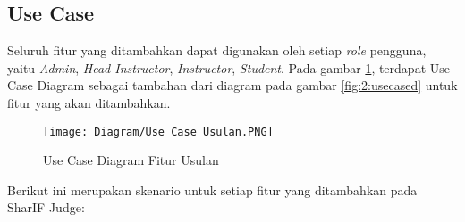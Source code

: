 \subsection{Use Case}

Seluruh fitur yang ditambahkan dapat digunakan oleh setiap \textit{role} pengguna, yaitu \textit{Admin}, \textit{Head Instructor}, \textit{Instructor}, \textit{Student}. Pada gambar \ref{fig:3:usecase}, terdapat Use Case Diagram sebagai tambahan dari diagram pada gambar \ref{fig:2:usecased} untuk fitur yang akan ditambahkan. 

\begin{figure}[H]
	\centering  
	\texttt{[image: Diagram/Use Case Usulan.PNG]}  
	\caption{Use Case Diagram Fitur Usulan}
	\label{fig:3:usecase} 
\end{figure} 

Berikut ini merupakan skenario untuk setiap fitur yang ditambahkan pada SharIF Judge:

